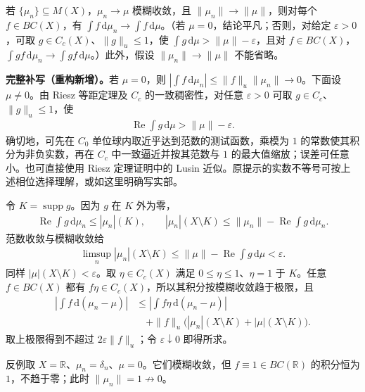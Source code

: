\documentclass[../../main.tex]{subfiles}
\begin{document}
\begin{exercise}\label{exercise:ch07-vague-norm-bounded-tests}
若 $\{\mu_n\}\subseteq M(X)$，$\mu_n\to\mu$ 模糊收敛，且 $\|\mu_n\|\to\|\mu\|$，则对每个 $f\in BC(X)$，有 $\int f\,\mathrm d\mu_n\to\int f\,\mathrm d\mu$。（若 $\mu=0$，结论平凡；否则，对给定 $\varepsilon>0$，可取 $g\in C_c(X)$、$\|g\|_u\leqslant1$，使 $\int g\,\mathrm d\mu>\|\mu\|-\varepsilon$，且对 $f\in BC(X)$，$\int gf\,\mathrm d\mu_n\to\int gf\,\mathrm d\mu$。）此外，假设 $\|\mu_n\|\to\|\mu\|$ 不能省略。
\end{exercise}
\begin{solution}
\textbf{完整补写（重构新增）。}若 $\mu=0$，则 $|\int f\,\mathrm d\mu_n|\leqslant\|f\|_u\|\mu_n\|\to0$。下面设 $\mu\ne0$。由 Riesz 等距定理及 $C_c$ 的一致稠密性，对任意 $\varepsilon>0$ 可取 $g\in C_c$、$\|g\|_u\leqslant1$，使
\begin{align*}
\operatorname{Re}\int g\,\mathrm d\mu>\|\mu\|-\varepsilon.
\end{align*}
确切地，可先在 $C_0$ 单位球内取近乎达到范数的测试函数，乘模为 $1$ 的常数使其积分为非负实数，再在 $C_c$ 中一致逼近并按其范数与 $1$ 的最大值缩放；误差可任意小。也可直接使用 Riesz 定理证明中的 Lusin 近似。原提示的实数不等号可按上述相位选择理解，或如这里明确写实部。

令 $K=\operatorname{supp}g$。因为 $g$ 在 $K$ 外为零，
\begin{align*}
\operatorname{Re}\int g\,\mathrm d\mu_n\leqslant|\mu_n|(K),\qquad
|\mu_n|(X\setminus K)\leqslant\|\mu_n\|-\operatorname{Re}\int g\,\mathrm d\mu_n.
\end{align*}
范数收敛与模糊收敛给
\begin{align*}
\limsup_n|\mu_n|(X\setminus K)
\leqslant\|\mu\|-\operatorname{Re}\int g\,\mathrm d\mu<\varepsilon.
\end{align*}
同样 $|\mu|(X\setminus K)<\varepsilon$。取 $\eta\in C_c(X)$ 满足 $0\leqslant\eta\leqslant1$、$\eta=1$ 于 $K$。任意 $f\in BC(X)$ 都有 $f\eta\in C_c(X)$，所以其积分按模糊收敛趋于极限，且
\begin{align*}
\left|\int f\,\mathrm d(\mu_n-\mu)\right|
&\leqslant\left|\int f\eta\,\mathrm d(\mu_n-\mu)\right|\\
&\quad+\|f\|_u\bigl(|\mu_n|(X\setminus K)+|\mu|(X\setminus K)\bigr).
\end{align*}
取上极限得到不超过 $2\varepsilon\|f\|_u$；令 $\varepsilon\downarrow0$ 即得所求。

反例取 $X=\mathbb R$、$\mu_n=\delta_n$、$\mu=0$。它们模糊收敛，但 $f\equiv1\in BC(\mathbb R)$ 的积分恒为 $1$，不趋于零；此时 $\|\mu_n\|=1\not\to0$。
\end{solution}
\end{document}
